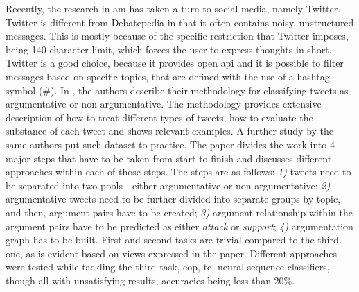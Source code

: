         Recently, the research in \gls{am} has taken a turn to social media, namely Twitter. Twitter is different from Debatepedia in that it often contains noisy, unstructured messages. This is mostly because of the specific restriction that Twitter imposes, being 140 character limit, which forces the user to express thoughts in short. Twitter is a good choice, because it provides open \gls{api} and it is possible to filter messages based on specific topics, that are defined with the use of a hashtag symbol (\#). In \autocite{Bosc2016DARTAD}, the authors describe their methodology for classifying tweets as argumentative or non-argumentative. The methodology provides extensive description of how to treat different types of tweets, how to evaluate the substance of each tweet and shows relevant examples. A further study \autocite{Bosc2016TweetiesSP} by the same authors put such dataset to practice. The paper divides the work into 4 major steps that have to be taken from start to finish and discusses different approaches within each of those steps. The steps are as follows: \textit{1)} tweets need to be separated into two pools - either argumentative or non-argumentative; \textit{2)} argumentative tweets need to be further divided into separate groups by topic, and then, argument pairs have to be created; \textit{3)} argument relationship within the argument pairs have to be predicted as either \textit{attack} or \textit{support}; \textit{4)} argumentation graph has to be built. First and second tasks are trivial compared to the third one, as is evident based on views expressed in the paper. Different approaches were tested while tackling the third task, \gls{eop}, \gls{te}, neural sequence classifiers, though all with unsatisfying results, accuracies being less than 20\%.
     
